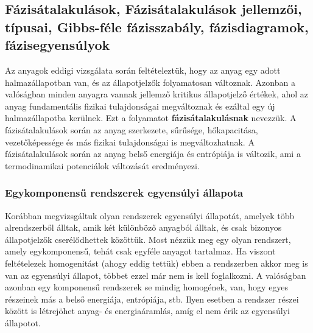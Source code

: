 \documentclass[a4paper,12pt]{article}
\begin{document}
\subsection{Fázisátalakulások, Fázisátalakulások jellemzői, típusai, Gibbs-féle fázisszabály, fázisdiagramok, fázisegyensúlyok}
Az anyagok eddigi vizsgálata során feltételeztük, hogy az anyag egy adott halmazállapotban van, és az állapotjelzők folyamatosan változnak.
Azonban a valóságban minden anyagra vannak jellemző kritikus állapotjelző értékek, ahol az anyag fundamentális fizikai tulajdonságai megváltoznak és ezáltal 
egy új halmazállapotba kerülnek. Ezt a folyamatot \textbf{fázisátalakulásnak} nevezzük. A fázisátalakulások során az anyag szerkezete, sűrűsége,
hőkapacitása, vezetőképessége és más fizikai tulajdonságai is megváltozhatnak. A fázisátalakulások során az anyag belső energiája és entrópiája is változik, ami a termodinamikai potenciálok
változását eredményezi.

\subsubsection{Egykomponensű rendszerek egyensúlyi állapota}
Korábban megvizsgáltuk olyan rendszerek egyensúlyi állapotát, amelyek több alrendszerből álltak, amik két különböző anyagból álltak, és csak
bizonyos állapotjelzők cserélődhettek közöttük. Most nézzük meg egy olyan rendszert, amely egykomponensű, tehát csak egyféle anyagot tartalmaz. 
Ha viszont feltételezek homogenitást (ahogy eddig tettük) ebben a rendszerben akkor meg is van az egyensúlyi állapot, többet ezzel már nem is kell foglalkozni.
A valóságban azonban egy komponensű rendszerek se mindig homogének, van, hogy egyes részeinek más a belső energiája, entrópiája, stb. Ilyen esetben a rendszer
részei között is létrejöhet anyag- és energiaáramlás, amíg el nem érik az egyensúlyi állapotot. 
\end{document}
